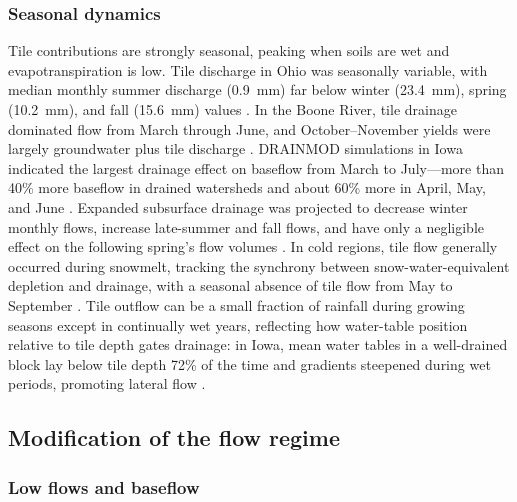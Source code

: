 \subsubsection{Seasonal dynamics}

Tile contributions are strongly seasonal, peaking when soils are wet and evapotranspiration is low. Tile discharge in Ohio was seasonally variable, with median monthly summer discharge (0.9~mm) far below winter (23.4~mm), spring (10.2~mm), and fall (15.6~mm) values \parencite{King2014}. In the Boone River, tile drainage dominated flow from March through June, and October--November yields were largely groundwater plus tile discharge \parencite{Schilling2019}. DRAINMOD simulations in Iowa indicated the largest drainage effect on baseflow from March to July---more than 40\% more baseflow in drained watersheds and about 60\% more in April, May, and June \parencite{Schilling2008}. Expanded subsurface drainage was projected to decrease winter monthly flows, increase late-summer and fall flows, and have only a negligible effect on the following spring's flow volumes \parencite{Rahman2014}. In cold regions, tile flow generally occurred during snowmelt, tracking the synchrony between snow-water-equivalent depletion and drainage, with a seasonal absence of tile flow from May to September \parencite{Kompanizare2024}. Tile outflow can be a small fraction of rainfall during growing seasons except in continually wet years, reflecting how water-table position relative to tile depth gates drainage: in Iowa, mean water tables in a well-drained block lay below tile depth 72\% of the time and gradients steepened during wet periods, promoting lateral flow \parencite{Logsdon2020}.

\subsection{Modification of the flow regime}

\subsubsection{Low flows and baseflow}

